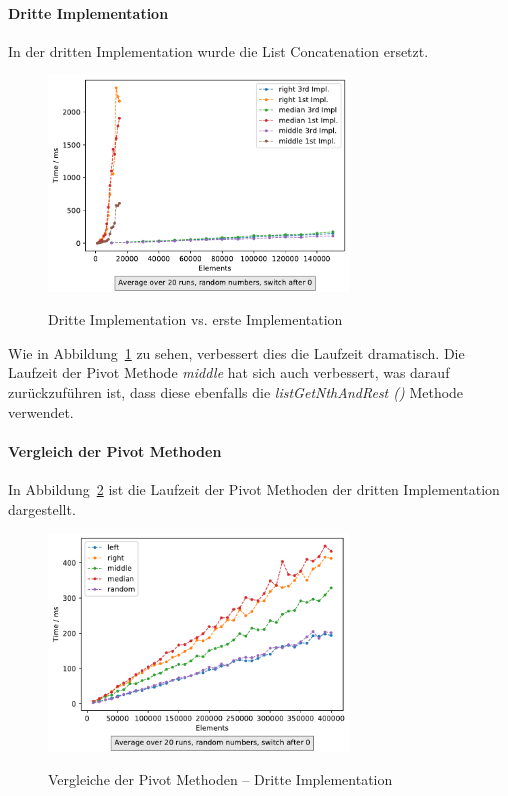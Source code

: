 \paragraph{Dritte Implementation}
In der dritten Implementation wurde die List Concatenation ersetzt.

\begin{figure}[hbt]
    \centering
    \caption{Dritte Implementation vs. erste Implementation}
    \includegraphics[width=8cm]
    {../out/pivotMethods_Implementation3.pdf}\label{fig:qsort-impl3}
\end{figure}

Wie in Abbildung~\ref{fig:qsort-impl3} zu sehen,
verbessert dies die Laufzeit dramatisch.
Die Laufzeit der Pivot Methode \textit{middle} hat sich auch verbessert, was
darauf zurückzuführen ist, dass diese ebenfalls die \textit{listGetNthAndRest
()} Methode verwendet.

\paragraph{Vergleich der Pivot Methoden}

In Abbildung~\ref{fig:qsort-impl3-2} ist die Laufzeit der Pivot Methoden der
dritten Implementation dargestellt.

\begin{figure}[hbt]
    \centering
    \caption{Vergleiche der Pivot Methoden -- Dritte Implementation}
    \includegraphics[width=8cm]
    {../out/pivotMethods.pdf}\label{fig:qsort-impl3-2}
\end{figure}

